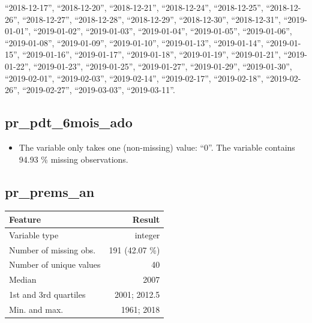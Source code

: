 \documentclass[
  letterpaper,
  DIV=11,
  numbers=noendperiod]{scrartcl}
\providecommand{\tightlist}{%
  \setlength{\itemsep}{0pt}\setlength{\parskip}{0pt}}
\begin{document}
\begin{itemize}
  ``2018-12-17'', ``2018-12-20'', ``2018-12-21'', ``2018-12-24'',
  ``2018-12-25'', ``2018-12-26'', ``2018-12-27'', ``2018-12-28'',
  ``2018-12-29'', ``2018-12-30'', ``2018-12-31'', ``2019-01-01'',
  ``2019-01-02'', ``2019-01-03'', ``2019-01-04'', ``2019-01-05'',
  ``2019-01-06'', ``2019-01-08'', ``2019-01-09'', ``2019-01-10'',
  ``2019-01-13'', ``2019-01-14'', ``2019-01-15'', ``2019-01-16'',
  ``2019-01-17'', ``2019-01-18'', ``2019-01-19'', ``2019-01-21'',
  ``2019-01-22'', ``2019-01-23'', ``2019-01-25'', ``2019-01-27'',
  ``2019-01-29'', ``2019-01-30'', ``2019-02-01'', ``2019-02-03'',
  ``2019-02-14'', ``2019-02-17'', ``2019-02-18'', ``2019-02-26'',
  ``2019-02-27'', ``2019-03-03'', ``2019-03-11''.
\end{itemize}

\fullline

\subsection{pr\_pdt\_6mois\_ado}\label{pr_pdt_6mois_ado}

\begin{itemize}
\tightlist
\item
  The variable only takes one (non-missing) value: ``0''. The variable
  contains 94.93 \% missing observations.
\end{itemize}

\fullline

\subsection{pr\_prems\_an}\label{pr_prems_an}

\bminione

\begin{longtable}[]{@{}lr@{}}
\toprule\noalign{}
Feature & Result \\
\midrule\noalign{}
\endhead
\bottomrule\noalign{}
\endlastfoot
Variable type & integer \\
Number of missing obs. & 191 (42.07 \%) \\
Number of unique values & 40 \\
Median & 2007 \\
1st and 3rd quartiles & 2001; 2012.5 \\
Min. and max. & 1961; 2018 \\
\end{longtable}

\emini
\bminitwo
\end{document}
